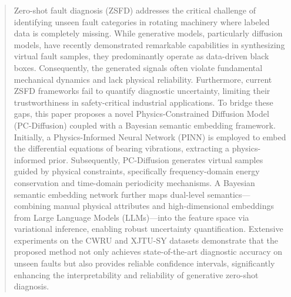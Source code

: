 \begin{abstract}
Zero-shot fault diagnosis (ZSFD) addresses the critical challenge of identifying unseen fault categories in rotating machinery where labeled data is completely missing. While generative models, particularly diffusion models, have recently demonstrated remarkable capabilities in synthesizing virtual fault samples, they predominantly operate as data-driven black boxes. Consequently, the generated signals often violate fundamental mechanical dynamics and lack physical reliability. Furthermore, current ZSFD frameworks fail to quantify diagnostic uncertainty, limiting their trustworthiness in safety-critical industrial applications. To bridge these gaps, this paper proposes a novel Physics-Constrained Diffusion Model (PC-Diffusion) coupled with a Bayesian semantic embedding framework. Initially, a Physics-Informed Neural Network (PINN) is employed to embed the differential equations of bearing vibrations, extracting a physics-informed prior. Subsequently, PC-Diffusion generates virtual samples guided by physical constraints, specifically frequency-domain energy conservation and time-domain periodicity mechanisms. A Bayesian semantic embedding network further maps dual-level semantics—combining manual physical attributes and high-dimensional embeddings from Large Language Models (LLMs)—into the feature space via variational inference, enabling robust uncertainty quantification. Extensive experiments on the CWRU and XJTU-SY datasets demonstrate that the proposed method not only achieves state-of-the-art diagnostic accuracy on unseen faults but also provides reliable confidence intervals, significantly enhancing the interpretability and reliability of generative zero-shot diagnosis.
\end{abstract}